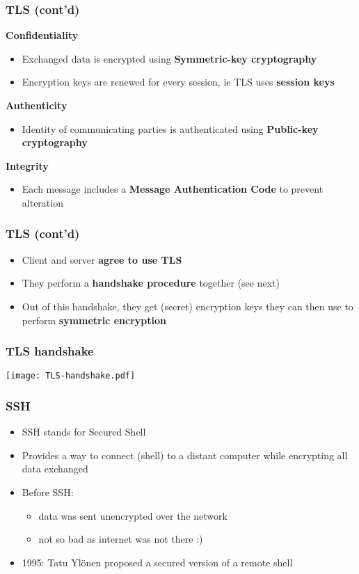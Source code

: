 \documentclass[
hyperref={pdfpagelabels=false}
,xcolor=table
]
{beamer}
\begin{document}
\begin{frame}
  \frametitle{TLS (cont'd)}

  \textbf{Confidentiality}
  \begin{itemize}
  \item Exchanged data is encrypted using \textbf{Symmetric-key cryptography}
  \item Encryption keys are renewed for every session, ie TLS uses \textbf{session keys}
  \end{itemize}

  \textbf{Authenticity}
  \begin{itemize}
  \item Identity of communicating parties is authenticated using \textbf{Public-key cryptography}
  \end{itemize}

  \textbf{Integrity}
  \begin{itemize}
  \item Each message includes a \textbf{Message Authentication Code} to prevent alteration
  \end{itemize}
\end{frame}


\begin{frame}
  \frametitle{TLS (cont'd)}

  \begin{itemize}
  \item Client and server \textbf{agree to use TLS}
  \item They perform a \textbf{handshake procedure} together (see next)
  \item Out of this handshake, they get (secret) encryption keys they can then use to perform \textbf{symmetric encryption}
  \end{itemize}
 
\end{frame}


\begin{frame}
  \frametitle{TLS handshake}

  \begin{center}
    \texttt{[image: TLS-handshake.pdf]}
  \end{center}

\end{frame}


\begin{frame}
  \frametitle{SSH}
  \begin{itemize}
  \item SSH stands for Secured Shell
  \item Provides a way to connect (shell) to a distant computer while encrypting all data exchanged
  \item Before SSH:
    \begin{itemize}
    \item data was sent unencrypted over the network
    \item not so bad as internet was not there :) 
    \end{itemize}
  \item 1995: Tatu Ylönen proposed a secured version of a remote shell
  \end{itemize}
\end{frame}
\end{document}
